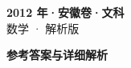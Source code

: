 \documentclass[zihao=-4, a4paper]{ctexart}
\begin{document}
\begin{center}
  {\Large\bfseries 2012 年·安徽卷·文科}\\[4pt]
  {\large 数学 · 解析版}
\end{center}
\medskip
{}

\clearpage
{}
\begin{center}{\Large\bfseries 参考答案与详细解析}\end{center}
\medskip

\end{document}
